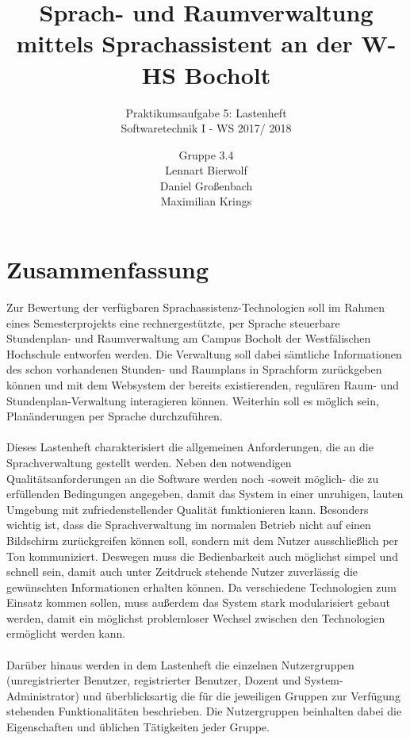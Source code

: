 \documentclass[12pt, a4paper]{scrartcl}
\newcommand\tab[1][1cm]{\hspace*{#1}}
\begin{document}
	\title{Sprach- und Raumverwaltung mittels Sprachassistent an der W-HS Bocholt}
	\subtitle{Praktikumsaufgabe 5: Lastenheft\\
	\large Softwaretechnik I - WS 2017/ 2018}
 
	\author{Gruppe 3.4\\
		Lennart Bierwolf\\Daniel Großenbach\\Maximilian Krings}
	\maketitle
	\thispagestyle{fancy} %
	\begin{center}
		
	\end{center}


\newpage
	
\tableofcontents
\newpage
\section{Zusammenfassung}
Zur Bewertung der verfügbaren Sprachassistenz-Technologien soll im Rahmen eines Semesterprojekts eine rechnergestützte, per Sprache steuerbare Stundenplan- und Raumverwaltung am Campus Bocholt der Westfälischen Hochschule entworfen werden. Die Verwaltung soll dabei sämtliche Informationen des schon vorhandenen Stunden- und Raumplans in Sprachform zurückgeben können und mit dem Websystem der bereits existierenden, regulären Raum- und Stundenplan-Verwaltung interagieren können. Weiterhin soll es möglich sein, Planänderungen per Sprache durchzuführen.\\
\\
Dieses Lastenheft charakterisiert die allgemeinen Anforderungen, die an die Sprachverwaltung gestellt werden. Neben den notwendigen Qualitätsanforderungen an die Software werden noch -soweit möglich- die zu erfüllenden Bedingungen angegeben, damit das System in einer unruhigen, lauten Umgebung mit zufriedenstellender Qualität funktionieren kann. Besonders wichtig ist, dass die Sprachverwaltung im normalen Betrieb nicht auf einen Bildschirm zurückgreifen können soll, sondern mit dem Nutzer ausschließlich per Ton kommuniziert. Deswegen muss die Bedienbarkeit auch möglichst simpel und schnell sein, damit auch unter Zeitdruck stehende Nutzer zuverlässig die gewünschten Informationen erhalten können. Da verschiedene Technologien zum Einsatz kommen sollen, muss außerdem das System stark modularisiert gebaut werden, damit ein möglichst problemloser Wechsel zwischen den Technologien ermöglicht werden kann.\\
\\
Darüber hinaus werden in dem Lastenheft die einzelnen Nutzergruppen (unregistrierter Benutzer, registrierter Benutzer,  Dozent und System-Administrator) und überblicksartig die für die jeweiligen Gruppen zur Verfügung stehenden Funktionalitäten beschrieben. Die Nutzergruppen beinhalten dabei die Eigenschaften und üblichen Tätigkeiten jeder Gruppe.
\end{document}
